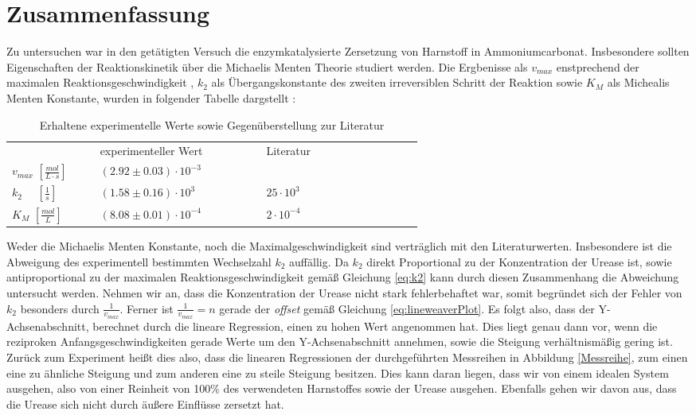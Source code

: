 % 
%
\section{Zusammenfassung}
Zu untersuchen war in den getätigten Versuch die enzymkatalysierte Zersetzung von Harnstoff in Ammoniumcarbonat. Insbesondere sollten Eigenschaften der Reaktionskinetik über die Michaelis Menten Theorie studiert werden. Die Ergbenisse als $v_{max}$ enstprechend der maximalen Reaktionsgeschwindigkeit , $k_2$ als Übergangskonstante des zweiten irreversiblen Schritt der Reaktion sowie $K_M$ als Michealis Menten Konstante, wurden in folgender Tabelle dargstellt :
\begin{table}[H]
	\centering
	\label{Erg}
	\caption{Erhaltene experimentelle Werte sowie Gegenüberstellung zur Literatur}
	\renewcommand*{\arraystretch}{1.4}
	\begin{tabular}{C{0.1\linewidth}|C{0.25\linewidth}C{0.25\linewidth}}
				& experimenteller Wert & Literatur\cite{otto} \\
		$ v_{max}\,\, [\si{\frac{mol}{L\cdot s}}] $ & $(2.92 \pm 0.03) \cdot 10^{-3}$ &   \\
		$k_2\,\,\,\,\,\,\,\, [\si{\frac{1}{s}}]$ & $(1.58 \pm 0.16)\cdot 10^{3}$ &  $25 \cdot 10^3$\\
		$K_M\,\, [\si{\frac{mol}{L}}]$& $(8.08 \pm 0.01) \cdot 10^{-4}$& $2 \cdot 10^{-4}$\\
	\end{tabular}
\end{table}
Weder die Michaelis Menten Konstante, noch die Maximalgeschwindigkeit sind verträglich mit den Literaturwerten. Insbesondere ist die Abweigung des experimentell bestimmten Wechselzahl $k_2$ auffällig. Da $k_2$ direkt Proportional zu der Konzentration der Urease ist, sowie antiproportional zu der maximalen Reaktionsgeschwindigkeit gemäß Gleichung \ref{eq:k2} kann durch diesen Zusammenhang die Abweichung untersucht werden. Nehmen wir an, dass die Konzentration der Urease nicht stark fehlerbehaftet war, somit begründet sich der Fehler von $k_2$ besonders durch $\frac{1}{v_{max}}$. Ferner ist $\frac{1}{v_{max}} = n$ gerade der \textit{offset} gemäß Gleichung \ref{eq:lineweaverPlot}. Es folgt also, dass der Y-Achsenabschnitt, berechnet durch die lineare Regression, einen zu hohen Wert angenommen hat. Dies liegt genau dann vor, wenn die reziproken Anfangsgeschwindigkeiten gerade Werte um den Y-Achsenabschnitt annehmen, sowie die Steigung verhältnismäßig gering ist. Zurück zum Experiment heißt dies also, dass die linearen Regressionen der durchgeführten Messreihen in Abbildung \ref{Messreihe}, zum einen eine zu ähnliche Steigung und zum anderen eine zu steile Steigung besitzen. Dies kann daran liegen, dass wir von einem idealen System ausgehen, also von einer Reinheit von 100\% des verwendeten Harnstoffes sowie der Urease ausgehen. Ebenfalls gehen wir davon aus, dass die Urease sich nicht durch äußere Einflüsse zersetzt hat. 

%


